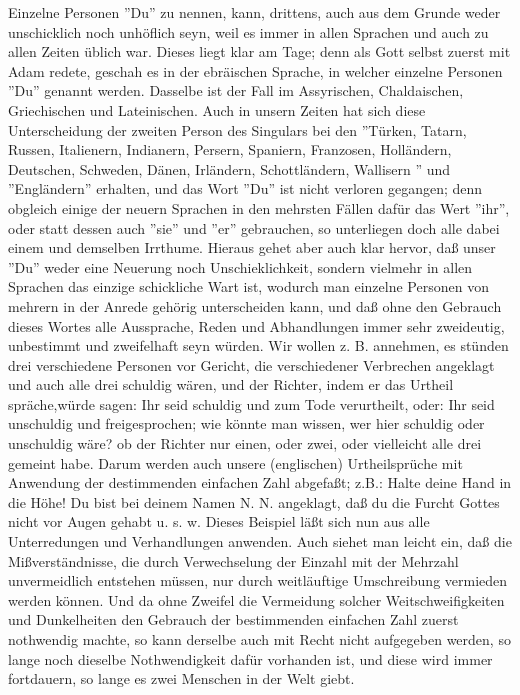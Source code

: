 Einzelne Personen ''Du'' zu nennen, kann, drittens, auch aus dem Grunde weder unschicklich noch unhöflich seyn, weil es immer in allen Sprachen und auch zu allen Zeiten üblich war. Dieses liegt klar am Tage; denn als Gott selbst zuerst mit Adam redete, geschah es in der ebräischen Sprache, in welcher einzelne Personen ''Du'' genannt werden. Dasselbe ist der Fall im Assyrischen, Chaldaischen, Griechischen und Lateinischen. Auch in unsern Zeiten hat sich diese Unterscheidung der zweiten Person des Singulars bei den ''Türken, Tatarn, Russen, Italienern, Indianern, Persern, Spaniern, Franzosen, Holländern, Deutschen, Schweden, Dänen, Irländern, Schottländern, Wallisern
'' und ''Engländern'' erhalten, und das Wort ''Du'' ist nicht verloren gegangen; denn obgleich einige der neuern Sprachen in den mehrsten Fällen dafür das Wert ''ihr'', oder statt dessen auch ''sie'' und ''er'' gebrauchen, so unterliegen doch alle dabei einem und demselben Irrthume. Hieraus gehet aber auch klar hervor, daß unser ''Du'' weder eine Neuerung noch Unschieklichkeit, sondern vielmehr in allen Sprachen das einzige schickliche Wart ist, wodurch man einzelne Personen von mehrern in der Anrede gehörig unterscheiden kann, und daß ohne den Gebrauch dieses Wortes alle Aussprache, Reden und Abhandlungen immer sehr zweideutig, unbestimmt und zweifelhaft seyn würden. Wir wollen z. B. annehmen, es stünden drei verschiedene Personen vor Gericht, die verschiedener Verbrechen angeklagt und auch alle drei schuldig wären, und der Richter, indem er das Urtheil spräche,würde sagen: Ihr seid schuldig und zum Tode verurtheilt, oder: Ihr seid unschuldig und freigesprochen; wie könnte man wissen, wer hier schuldig oder unschuldig wäre? ob der Richter nur einen, oder zwei, oder vielleicht alle drei gemeint habe. Darum werden auch unsere (englischen) Urtheilsprüche mit Anwendung der destimmenden einfachen Zahl abgefaßt; z.B.: Halte deine Hand in die Höhe! Du bist bei deinem Namen N. N. angeklagt, daß du die Furcht Gottes nicht vor Augen gehabt u. s. w. Dieses Beispiel läßt sich nun aus alle Unterredungen und Verhandlungen anwenden. Auch siehet man leicht ein, daß die Mißverständnisse, die durch Verwechselung der Einzahl mit der Mehrzahl unvermeidlich entstehen müssen, nur durch weitläuftige Umschreibung vermieden werden können. Und da ohne Zweifel die Vermeidung solcher Weitschweifigkeiten und Dunkelheiten den Gebrauch der bestimmenden einfachen Zahl zuerst nothwendig machte, so kann derselbe auch mit Recht nicht aufgegeben werden, so lange noch dieselbe Nothwendigkeit dafür vorhanden ist, und diese wird immer fortdauern, so lange es zwei Menschen in der Welt giebt.

